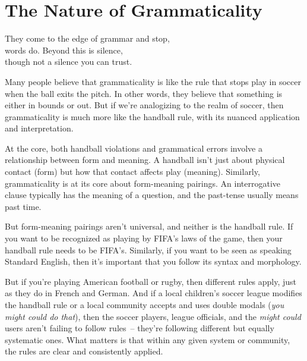 \chapter{The Nature of Grammaticality} \label{ch:grammaticality}

\epigraph{They come to the edge of grammar and stop,\\
words do. Beyond this is silence,\\
though not a silence you can trust.}{}

Many people believe that grammaticality is like the rule that stops play in soccer when the ball exits the pitch. In other words, they believe that something is either in bounds or out. But if we're analogizing to the realm of soccer, then grammaticality is much more like the handball rule, with its nuanced application and interpretation.

At the core, both handball violations and grammatical errors involve a relationship between form and meaning. A handball isn't just about physical contact (form) but how that contact affects play (meaning). Similarly, grammaticality is at its core about form-meaning pairings. An interrogative clause typically has the meaning of a question, and the past-tense usually means past time.

But form-meaning pairings aren't universal, and neither is the handball rule. If you want to be recognized as playing by FIFA's laws of the game, then your handball rule needs to be FIFA's. Similarly, if you want to be seen as speaking Standard English, then it's important that you follow its syntax and morphology.

But if you're playing American football or rugby, then different rules apply, just as they do in French and German. And if a local children's soccer league modifies the handball rule or a local community accepts and uses double modals (\textit{you might could do that}), then the soccer players, league officials, and the \textit{might could} users aren't failing to follow rules~-- they're following different but equally systematic ones. What matters is that within any given system or community, the rules are clear and consistently applied.

